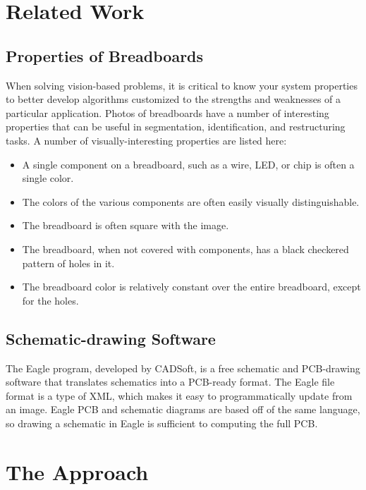 \documentclass[10pt,twocolumn,letterpaper]{article}
\begin{document}
\section{Related Work}

\subsection{Properties of Breadboards}

When solving vision-based problems, it is critical to know your system
properties to better develop algorithms customized to the strengths and
weaknesses of a particular application. Photos of breadboards have a number of
interesting properties that can be useful in segmentation, identification, and
restructuring tasks. A number of visually-interesting properties are listed here:
\begin{itemize}
\item A single component on a breadboard, such as a wire, LED, or chip is often a single color. 
\item The colors of the various components are often easily visually distinguishable. 
\item The breadboard is often square with the image. 
\item The breadboard, when not covered with components, has a black checkered pattern of holes in it. 
\item The breadboard color is relatively constant over the entire breadboard, except for the holes.
\end{itemize}

\subsection{Schematic-drawing Software}

The Eagle program, developed by CADSoft, is a free schematic and PCB-drawing
software that translates schematics into a PCB-ready format. The Eagle file
format is a type of XML, which makes it easy to programmatically update from an
image. Eagle PCB and schematic diagrams are based off of the same language, so
drawing a schematic in Eagle is sufficient to computing the full PCB. 

\section{The Approach}
\end{document}

